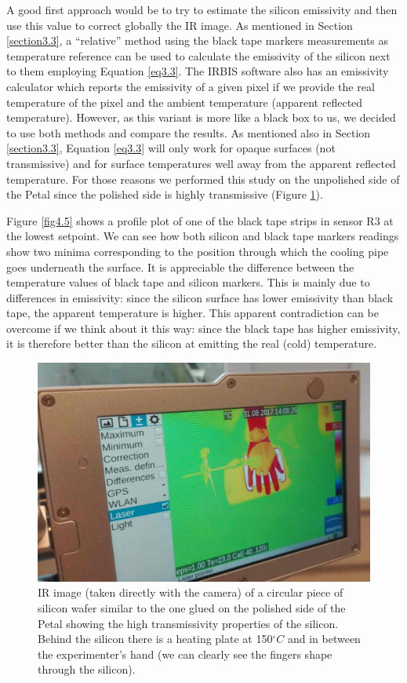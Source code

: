 		A good first approach would be to try to estimate the silicon emissivity and then use this value to correct globally the IR image. As mentioned in Section \ref{section3.3}, a “relative” method using the black tape markers measurements as temperature reference can be used to calculate the emissivity of the silicon next to them employing Equation \ref{eq3.3}. The IRBIS software also has an emissivity calculator which reports the emissivity of a given pixel if we provide the real temperature of the pixel and the ambient temperature (apparent reflected temperature). However, as this variant is more like a black box to us, we decided to use both methods and compare the results. As mentioned also in Section \ref{section3.3}, Equation \ref{eq3.3} will only work for opaque surfaces (not transmissive) and for surface temperatures well away from the apparent reflected temperature. For those reasons we performed this study on the unpolished side of the Petal since the polished side is highly transmissive (Figure \ref{fig4.4}).
		
		Figure \ref{fig4.5} shows a profile plot of one of the black tape strips in sensor R3 at the lowest setpoint. We can see how both silicon and black tape markers readings show two minima corresponding to the position through which the cooling pipe goes underneath the surface. It is appreciable the difference between the temperature values of black tape and silicon markers. This is mainly due to differences in emissivity: since the silicon surface has lower emissivity than black tape, the apparent temperature is higher. This apparent contradiction can be overcome if we think about it this way: since the black tape has higher emissivity, it is therefore better than the silicon at emitting the real (cold) temperature.
		
		\begin{figure}[ht!]
			\centering
			\captionsetup{justification=centering,margin=2cm}
			\includegraphics[scale=0.35]{Figures/Chapter04/HandTransmission.jpg}
			\caption{IR image (taken directly with the camera) of a circular piece of silicon wafer similar to the one glued on the polished side of the Petal showing the high transmissivity properties of the silicon. Behind the silicon there is a heating plate at 150\space$^\circ C$ and in between the experimenter’s hand (we can clearly see the fingers shape through the silicon).}\label{fig4.4}
		\end{figure}
		
